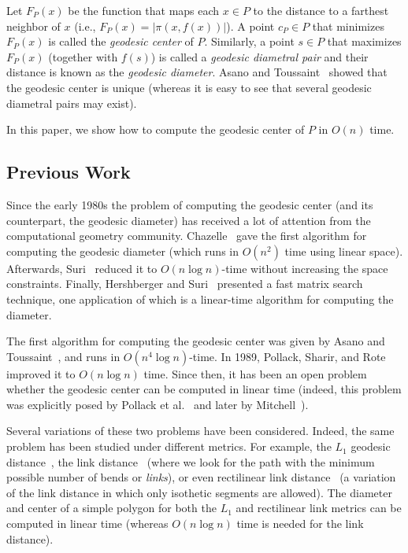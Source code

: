 \documentclass[a4paper,UKenglish]{lipics}
\newcommand{\F}[2]{\ensuremath{F_{\scriptscriptstyle #1}(#2)}}
\newcommand{\ff}[1]{\ensuremath{f(#1)}}
\newcommand{\cp}{\ensuremath{c_P}}
\newcommand{\g}[2]{\ensuremath{|\pi(#1, #2)|}}
\begin{document}
Let $\F{P}{x}$ be the function that maps each $x\in P$ to the distance to a farthest neighbor of $x$ (i.e., $\F{P}{x} = \g{x}{\ff{x}}$).
A point $\cp\in P$ that minimizes $\F{P}{x}$ is called the \emph{geodesic center} of $P$. Similarly, a point $s\in P$ that maximizes $\F{P}{x}$ (together with $\ff{s}$) is called a \emph{geodesic diametral pair} and their distance is known as the \emph{geodesic diameter}. Asano and Toussaint~\cite{at-cgcsp-85} showed that the geodesic center is unique (whereas it is easy to see that several geodesic diametral pairs may exist).

In this paper, we show how to compute the geodesic center of $P$ in $O(n)$ time.

\subsection{Previous Work}
Since the early 1980s the problem of computing the geodesic center (and its counterpart, the geodesic diameter) has received a lot of attention from the computational geometry community. Chazelle~\cite{c-tpca-82} gave the first algorithm for computing the geodesic diameter (which runs in $O(n^2)$ time using linear space). Afterwards, Suri~\cite{suri1989computing} reduced it to $O(n\log n)$-time without increasing the space constraints. Finally, Hershberger and Suri~\cite{hershberger1993matrix} presented a fast matrix search technique, one application of which is a linear-time algorithm for computing the diameter.

The first algorithm for computing the geodesic center was given by Asano and Toussaint~\cite{at-cgcsp-85}, and runs in $O(n^4\log n)$-time. In 1989, Pollack, Sharir, and Rote~\cite{pollackComputingCenter} improved it to $O(n\log n)$ time. Since then, it has been an open problem whether the geodesic center can be
computed in linear time (indeed, this problem was explicitly posed by Pollack et al.~\cite{pollackComputingCenter} and later by Mitchell~\cite[Chapter 27]{m-gspno-00}).

Several variations of these two problems have been considered. Indeed, the same problem has been studied under different metrics. For example, the $L_1$ geodesic distance~\cite{bkow-clgdcsplt-13},  the link distance~\cite{suri-mlpprp-87,k-ealdp-89,dls-aclcsp-92} (where we look for the path with the minimum possible number of bends or {\em links}), or even rectilinear link distance~\cite{ns-crldp-91,ns-oarlcrp-96} (a variation of the link distance in which only isothetic segments are allowed). The diameter and center of a simple polygon for both the $L_1$ and rectilinear link metrics can be computed in linear time (whereas $O(n\log n)$ time is needed for the link distance).
\end{document}
